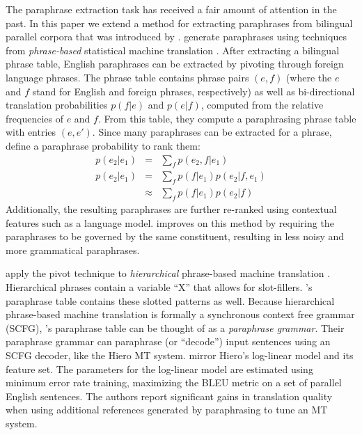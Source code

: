 \documentclass[11pt]{article}
\DeclareMathOperator*{\argmax}{arg\,max}
\begin{document}
The paraphrase extraction task has received a fair amount of attention
in the past.  In this paper we extend a method for extracting paraphrases from bilingual parallel corpora 
that was introduced by .  generate paraphrases using techniques from {\it phrase-based} statistical machine translation \cite{Koehn2003}.    After extracting a bilingual phrase table, English paraphrases can be extracted by pivoting through foreign language phrases. The phrase table
contains phrase pairs $(e, f)$ (where the $e$ and $f$ stand for
English and foreign phrases, respectively) as well as bi-directional
translation probabilities $p(f | e)$ and $p(e | f)$, computed from the
relative frequencies of $e$ and $f$. From this table, they compute a
paraphrasing phrase table with entries $(e, e')$.   Since many paraphrases can be extracted for a phrase,  define  a paraphrase probability to rank them:
\begin{eqnarray}
p(e_2|e_1)&=&\sum_f p(e_2,f|e_1)\\
p(e_2|e_1) 	&=&			\sum_f p(f|e_1) p(e_2|f,e_1)\\
			&\approx& 	\sum_f p(f|e_1) p(e_2|f)
\label{paraphrase-prob-eqn}
\end{eqnarray}
Additionally, the resulting paraphrases are further re-ranked using
contextual features such as a language
model.  improves on this method by
requiring the paraphrases to be governed by the same constituent,
resulting in less noisy and more grammatical paraphrases.

 apply the pivot technique to {\it hierarchical} phrase-based machine translation \cite{Chiang2005}.  Hierarchical phrases contain a variable ``X'' that allows for slot-fillers.  's paraphrase table contains these slotted patterns as well.  Because hierarchical phrase-based machine translation is formally a synchronous context free grammar (SCFG), 's paraphrase table can be thought of as a {\it paraphrase grammar}.   Their paraphrase grammar can paraphrase (or ``decode'') input sentences using an SCFG decoder, like the Hiero MT
system.    mirror Hiero's log-linear model and its feature set.  The parameters for the log-linear model are estimated using
minimum error rate training, maximizing the BLEU metric on a set of
parallel English sentences. The authors report significant gains in
translation quality when using additional references generated by
paraphrasing to tune an MT system.
\end{document}
